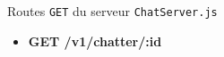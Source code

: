 \documentclass{beamer}
\begin{document}
\begin{frame}{Routes \lstinline{GET} du serveur \lstinline{ChatServer.js}}
\begin{small}
\begin{itemize}
\begin{itemize}
\begin{tiny}
                    \end{tiny}
                \end{itemize}
                \item \textbf{GET /v1/chatter/:id}
                \begin{itemize}
                \end{itemize}
            \end{itemize}
        \end{small}
    \end{frame}
\end{document}
